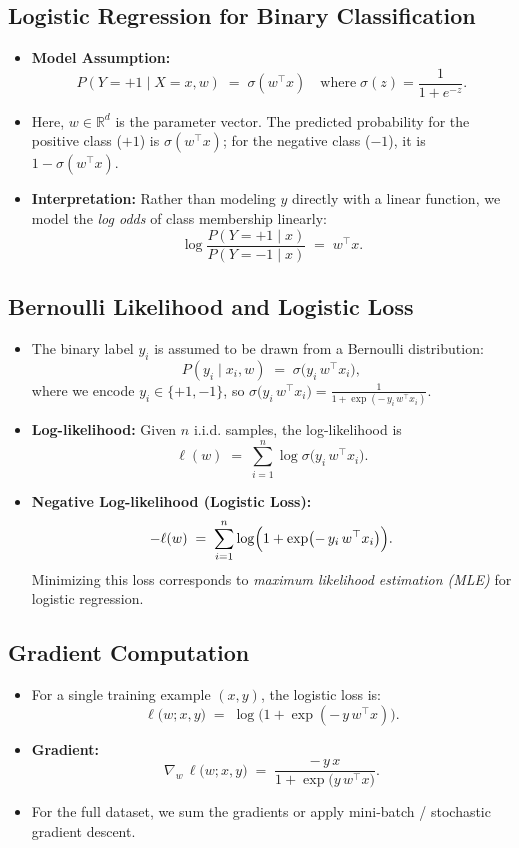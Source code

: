 \documentclass[twocolumn]{article}
\begin{document}
\begin{spacing}{1}
\subsection{Logistic Regression for Binary Classification}
\begin{itemize}
    \item \textbf{Model Assumption:} 
    \[
        P(Y = +1 \mid X = x, w) \;=\; \sigma(w^\top x) 
        \quad\text{where}\; \sigma(z) = \frac{1}{1+e^{-z}}.
    \]
    \item Here, $w \in \mathbb{R}^d$ is the parameter vector. The predicted probability for the positive class ($+1$) is $\sigma(w^\top x)$; for the negative class ($-1$), it is $1 - \sigma(w^\top x)$.
    \item \textbf{Interpretation:} Rather than modeling $y$ directly with a linear function, we model the \emph{log odds} of class membership linearly:
    \[
        \log \frac{P(Y=+1 \mid x)}{P(Y=-1 \mid x)} \;=\; w^\top x.
    \]
\end{itemize}

\subsection{Bernoulli Likelihood and Logistic Loss}
\begin{itemize}
    \item The binary label $y_i$ is assumed to be drawn from a Bernoulli distribution:
    \[
        P(y_i \mid x_i, w) \;=\; \sigma\bigl(y_i \, w^\top x_i\bigr),
    \]
    where we encode $y_i \in \{+1, -1\}$, so $\sigma\bigl(y_i\,w^\top x_i\bigr) = \frac{1}{1+\exp(-\,y_i\,w^\top x_i)}.$
    \item \textbf{Log-likelihood:} Given $n$ i.i.d. samples, the log-likelihood is
    \[
        \ell(w) \;=\; \sum_{i=1}^n \log \sigma\bigl(y_i\,w^\top x_i\bigr).
    \]
    \item \textbf{Negative Log-likelihood (Logistic Loss):}
    \[
        -\ell(w) \;=\; \sum_{i=1}^n \log \Bigl(1 + \exp\bigl(-\,y_i\,w^\top x_i\bigr)\Bigr).
    \]
    Minimizing this loss corresponds to \emph{maximum likelihood estimation (MLE)} for logistic regression.
\end{itemize}

\subsection{Gradient Computation}
\begin{itemize}
    \item For a single training example $(x, y)$, the logistic loss is:
    \[
        \ell\bigl(w; x, y\bigr)
        \;=\;
        \log\bigl(1 + \exp(-\,y\,w^\top x)\bigr).
    \]
    \item \textbf{Gradient:}
    \[
        \nabla_w \,\ell\bigl(w; x, y\bigr)
        \;=\;
        \frac{-\,y \, x}{1 + \exp\bigl(y\, w^\top x\bigr)}.
    \]
    \item For the full dataset, we sum the gradients or apply mini-batch / stochastic gradient descent.
\end{itemize}


\end{spacing}
\end{document}
